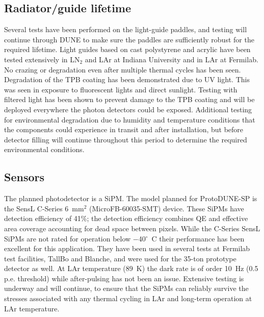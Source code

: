 \subsection{Radiator/guide lifetime}
Several tests have been performed on the light-guide paddles, and testing will 
continue through DUNE to make sure the paddles are sufficiently robust for the
required lifetime.
Light guides based on cast polystyrene and acrylic have been tested 
extensively in LN$_2$ and LAr at Indiana University and in LAr at Fermilab.
No crazing or degradation even after multiple thermal cycles has been seen.
Degradation of the TPB coating has been demonstrated due to UV light.
This was seen in exposure to fluorescent lights and direct sunlight.
Testing with filtered light %
has been shown to prevent damage
to the TPB coating and will be deployed everywhere the photon detectors
could be exposed.
Additional testing for environmental degradation due to humidity and 
temperature conditions that the components could experience in transit and 
after installation, but before detector filling will continue throughout this
period to determine the required environmental conditions.

\subsection{Sensors}
The planned photodetector is a SiPM.  
The model planned for ProtoDUNE-SP is the SensL C-Series 6~mm$^2$
(MicroFB-60035-SMT) device. These SiPMs have detection efficiency of
41\%; the detection efficiency combines QE and effective area
  coverage accounting for dead space between pixels. While the
C-Series SensL SiPMs are not rated for operation below
$-$40$^{\circ}$~C their performance has been excellent for this
application. 
They have been used in several tests at Fermilab test facilities,
TallBo and Blanche, and were used for the 35-ton prototype detector
as well.  At LAr temperature (89~K) the dark rate is of order 10~Hz
(0.5 p.e. threshold) while after-pulsing has not been an
issue. Extensive testing is underway and will continue, to ensure 
that the SiPMs can reliably survive the stresses associated with 
any thermal cycling in LAr and long-term operation at LAr temperature.

